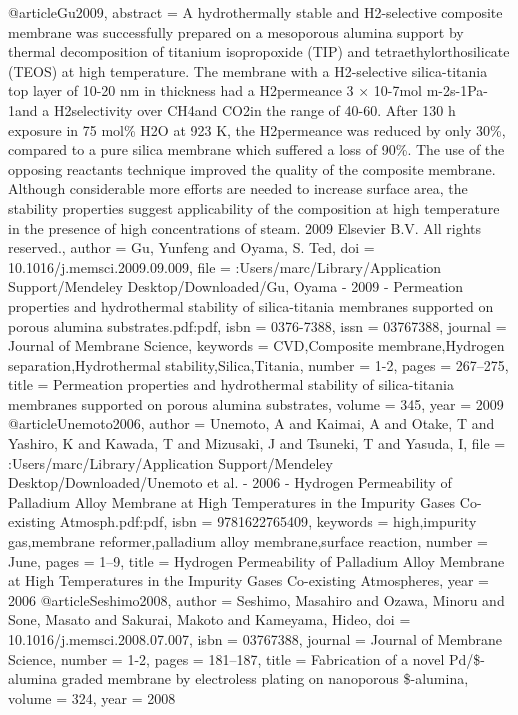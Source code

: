 @article{Gu2009,
abstract = {A hydrothermally stable and H2-selective composite membrane was successfully prepared on a mesoporous alumina support by thermal decomposition of titanium isopropoxide (TIP) and tetraethylorthosilicate (TEOS) at high temperature. The membrane with a H2-selective silica-titania top layer of 10-20 nm in thickness had a H2permeance 3 × 10-7mol m-2s-1Pa-1and a H2selectivity over CH4and CO2in the range of 40-60. After 130 h exposure in 75 mol{\%} H2O at 923 K, the H2permeance was reduced by only 30{\%}, compared to a pure silica membrane which suffered a loss of 90{\%}. The use of the opposing reactants technique improved the quality of the composite membrane. Although considerable more efforts are needed to increase surface area, the stability properties suggest applicability of the composition at high temperature in the presence of high concentrations of steam. {\textcopyright} 2009 Elsevier B.V. All rights reserved.},
author = {Gu, Yunfeng and Oyama, S. Ted},
doi = {10.1016/j.memsci.2009.09.009},
file = {:Users/marc/Library/Application Support/Mendeley Desktop/Downloaded/Gu, Oyama - 2009 - Permeation properties and hydrothermal stability of silica-titania membranes supported on porous alumina substrates.pdf:pdf},
isbn = {0376-7388},
issn = {03767388},
journal = {Journal of Membrane Science},
keywords = {CVD,Composite membrane,Hydrogen separation,Hydrothermal stability,Silica,Titania},
number = {1-2},
pages = {267--275},
title = {{Permeation properties and hydrothermal stability of silica-titania membranes supported on porous alumina substrates}},
volume = {345},
year = {2009}
}
@article{Unemoto2006,
author = {Unemoto, A and Kaimai, A and Otake, T and Yashiro, K and Kawada, T and Mizusaki, J and Tsuneki, T and Yasuda, I},
file = {:Users/marc/Library/Application Support/Mendeley Desktop/Downloaded/Unemoto et al. - 2006 - Hydrogen Permeability of Palladium Alloy Membrane at High Temperatures in the Impurity Gases Co-existing Atmosph.pdf:pdf},
isbn = {9781622765409},
keywords = {high,impurity gas,membrane reformer,palladium alloy membrane,surface reaction},
number = {June},
pages = {1--9},
title = {{Hydrogen Permeability of Palladium Alloy Membrane at High Temperatures in the Impurity Gases Co-existing Atmospheres}},
year = {2006}
}
@article{Seshimo2008,
author = {Seshimo, Masahiro and Ozawa, Minoru and Sone, Masato and Sakurai, Makoto and Kameyama, Hideo},
doi = {10.1016/j.memsci.2008.07.007},
isbn = {03767388},
journal = {Journal of Membrane Science},
number = {1-2},
pages = {181--187},
title = {{Fabrication of a novel Pd/{\$}\gamma{\$}-alumina graded membrane by electroless plating on nanoporous {\$}\gamma{\$}-alumina}},
volume = {324},
year = {2008}
}
